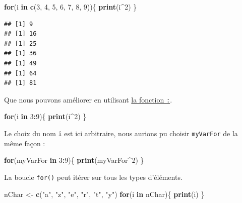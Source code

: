 \documentclass[
]{book}
\newenvironment{Shaded}{\begin{snugshade}}{\end{snugshade}}
\newcommand{\ControlFlowTok}[1]{\textcolor[rgb]{0.13,0.29,0.53}{\textbf{#1}}}
\newcommand{\DecValTok}[1]{\textcolor[rgb]{0.00,0.00,0.81}{#1}}
\newcommand{\KeywordTok}[1]{\textcolor[rgb]{0.13,0.29,0.53}{\textbf{#1}}}
\newcommand{\NormalTok}[1]{#1}
\newcommand{\OperatorTok}[1]{\textcolor[rgb]{0.81,0.36,0.00}{\textbf{#1}}}
\newcommand{\StringTok}[1]{\textcolor[rgb]{0.31,0.60,0.02}{#1}}
\begin{document}
\begin{Shaded}
\begin{Highlighting}[]
\ControlFlowTok{for}\NormalTok{(i }\ControlFlowTok{in} \KeywordTok{c}\NormalTok{(}\DecValTok{3}\NormalTok{, }\DecValTok{4}\NormalTok{, }\DecValTok{5}\NormalTok{, }\DecValTok{6}\NormalTok{, }\DecValTok{7}\NormalTok{, }\DecValTok{8}\NormalTok{, }\DecValTok{9}\NormalTok{))\{}
  \KeywordTok{print}\NormalTok{(i}\OperatorTok{^}\DecValTok{2}\NormalTok{)}
\NormalTok{\}}
\end{Highlighting}
\end{Shaded}

\begin{verbatim}
## [1] 9
## [1] 16
## [1] 25
## [1] 36
## [1] 49
## [1] 64
## [1] 81
\end{verbatim}

Que nous pouvons améliorer en utilisant \protect\hyperlink{l0152points}{la fonction \texttt{:}}.

\begin{Shaded}
\begin{Highlighting}[]
\ControlFlowTok{for}\NormalTok{(i }\ControlFlowTok{in} \DecValTok{3}\OperatorTok{:}\DecValTok{9}\NormalTok{)\{}
  \KeywordTok{print}\NormalTok{(i}\OperatorTok{^}\DecValTok{2}\NormalTok{)}
\NormalTok{\}}
\end{Highlighting}
\end{Shaded}

Le choix du nom \texttt{i} est ici arbitraire, nous aurions pu choisir \texttt{myVarFor} de la même façon :

\begin{Shaded}
\begin{Highlighting}[]
\ControlFlowTok{for}\NormalTok{(myVarFor }\ControlFlowTok{in} \DecValTok{3}\OperatorTok{:}\DecValTok{9}\NormalTok{)\{}
  \KeywordTok{print}\NormalTok{(myVarFor}\OperatorTok{^}\DecValTok{2}\NormalTok{)}
\NormalTok{\}}
\end{Highlighting}
\end{Shaded}

La boucle \texttt{for()} peut itérer sur tous les types d'éléments.

\begin{Shaded}
\begin{Highlighting}[]
\NormalTok{nChar <-}\StringTok{ }\KeywordTok{c}\NormalTok{(}\StringTok{"a"}\NormalTok{, }\StringTok{"z"}\NormalTok{, }\StringTok{"e"}\NormalTok{, }\StringTok{"r"}\NormalTok{, }\StringTok{"t"}\NormalTok{, }\StringTok{"y"}\NormalTok{)}
\ControlFlowTok{for}\NormalTok{(i }\ControlFlowTok{in}\NormalTok{ nChar)\{}
  \KeywordTok{print}\NormalTok{(i)}
\NormalTok{\}}
\end{Highlighting}
\end{Shaded}
\end{document}
